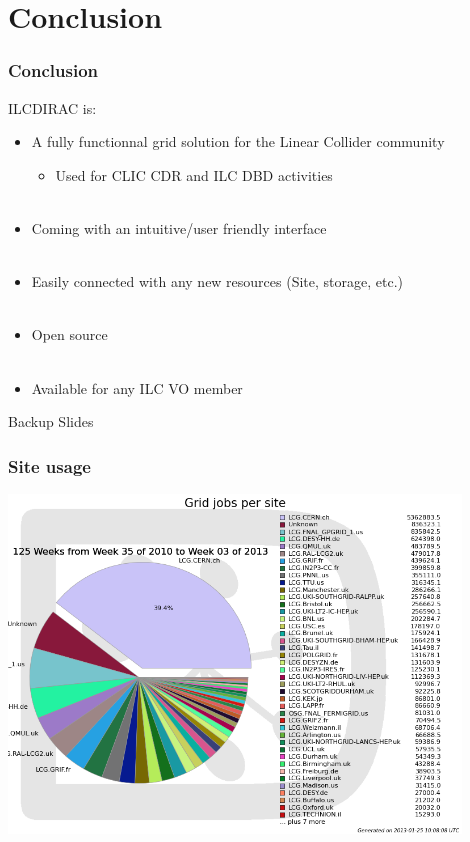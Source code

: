 \documentclass[10pt,table,dvipsnames]{beamer}
\newcommand{\interstitial}[1]{\begin{frame}\begin{block}{}\centering\Huge{#1}\end{block} \end{frame}}
\newcommand{\backupslides}{\interstitial{Backup Slides}}
\begin{document}
\section{Conclusion}
\label{sec:conc}
\begin{frame}
  \frametitle{Conclusion}
\begin{block}{ILCDIRAC is:}
\begin{itemize}
\item A \alert{fully functionnal grid solution} for the Linear Collider
  community
  \begin{itemize}
  \item Used for {\color{ForestGreen}CLIC CDR} and {\color{ForestGreen}ILC DBD} activities\\~\\
  \end{itemize}
\item Coming with an {\color{NavyBlue}intuitive/user friendly} interface\\
~\\
\item {\color{NavyBlue}Easily connected with any new resources} (Site, storage,
  etc.)\\
~\\
\item {\color{NavyBlue}Open source}\\
~\\
\item {\color{NavyBlue}Available} for any ILC VO member
\end{itemize}
\end{block}
\label{lastframe}
\end{frame}

\backupslides

\begin{frame}
  \frametitle{Site usage}
\centering
\includegraphics[width=0.9\textwidth]{PilotsPerSite}\\
\end{frame}
\end{document}
